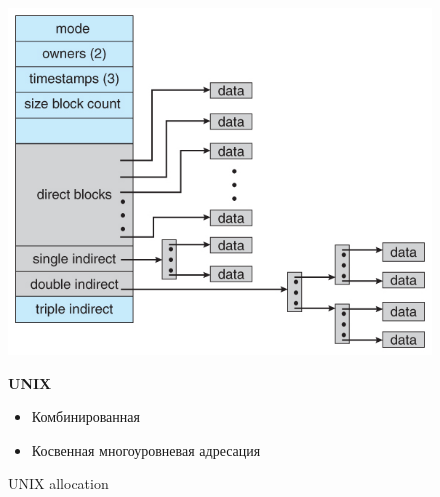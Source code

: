 \documentclass[../../lectures.tex]{subfiles}
\begin{document}
\begin{figure}[H]
\begin{minipage}[c]{0.47\linewidth}
\centering
\includegraphics[width=\textwidth]{images/unix-inode.jpg}
\caption{UNIX allocation}
\end{minipage}
\hspace{0.5cm}
\begin{minipage}[c]{0.5\linewidth}
\centering
\textbf{UNIX}
\begin{itemize}
    \item Комбинированная
    \item Косвенная многоуровневая адресация
\end{itemize}
\end{minipage}
\end{figure}
\end{document}
